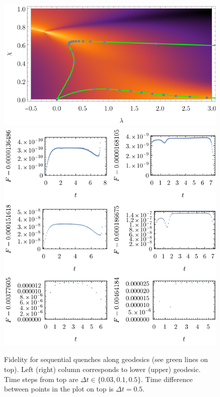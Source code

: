 \begin{figure}[H]
    \centering
    \includegraphics[scale=1.2]{../img/bg123.pdf}
    \includegraphics[scale=1.3]{../img/plotsFidelityQuenches.pdf}
    \caption{Fidelity for sequential quenches along geodesics (see green lines on top). Left (right) column corresponds to lower (upper) geodesic. Time steps from top are $\Delta t\in \{0.03,0.1,0.5\}$. Time difference between points in the plot on top is $\Delta t=0.5$.}
    \label{fig:plotsFidelityQuenches}    
\end{figure}



